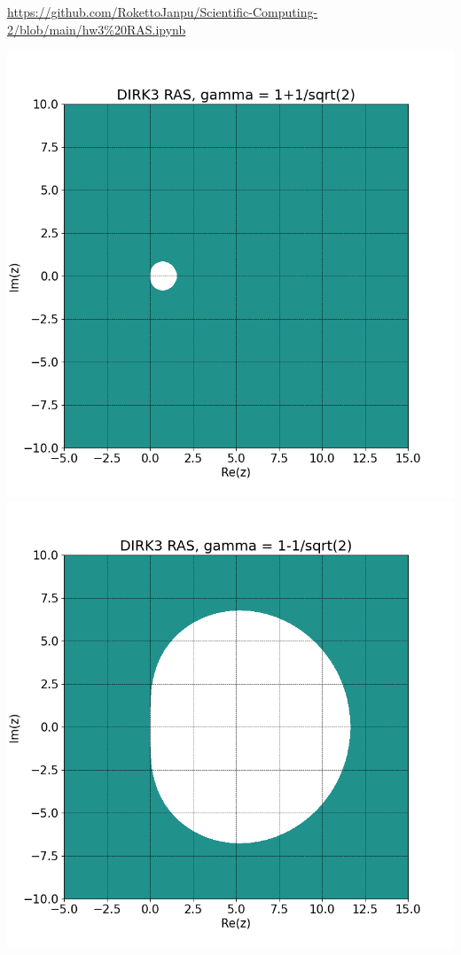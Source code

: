 \documentclass{article}
\newcommand{\sep}[1][.5cm]{\vspace{#1}}
\begin{document}
\begin{enumerate}
\url{https://github.com/RokettoJanpu/Scientific-Computing-2/blob/main/hw3%20RAS.ipynb}

\begin{center}
	\includegraphics[scale=.3]{hw3 dirk3 ras 1}
	\includegraphics[scale=.3]{hw3 dirk3 ras 2}
\end{center}

\end{enumerate}
\sep
\end{document}
